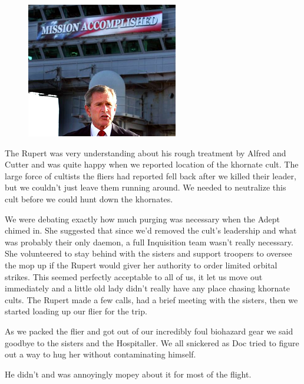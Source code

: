 \begin{figure}
	\begin{center}
		\includegraphics[width=\figwidth]{pics/6/28.png}
	\end{center}
\end{figure}
The Rupert was very understanding about his rough treatment by Alfred and Cutter and was quite happy when we reported location of the khornate cult. 
The large force of cultists the fliers had reported fell back after we killed their leader, but we couldn't just leave them running around. 
We needed to neutralize this cult before we could hunt down the khornates.

We were debating exactly how much purging was necessary when the Adept chimed in. 
She suggested that since we'd removed the cult's leadership and what was probably their only daemon, a full Inquisition team wasn't really necessary. 
She volunteered to stay behind with the sisters and support troopers to oversee the mop up if the Rupert would giver her authority to order limited orbital strikes. 
This seemed perfectly acceptable to all of us, it let us move out immediately and a little old lady didn't really have any place chasing khornate cults. 
The Rupert made a few calls, had a brief meeting with the sisters, then we started loading up our flier for the trip.

As we packed the flier and got out of our incredibly foul biohazard gear we said goodbye to the sisters and the Hospitaller. 
We all snickered as Doc tried to figure out a way to hug her without contaminating himself. 

He didn't and was annoyingly mopey about it for most of the flight.


